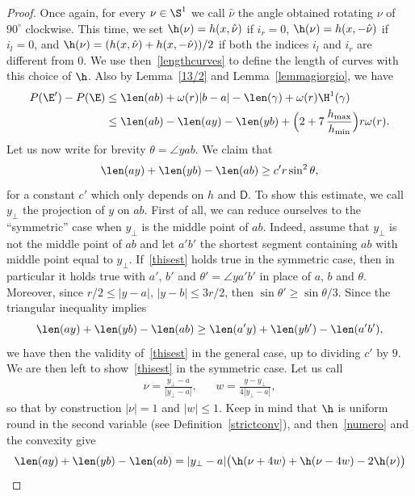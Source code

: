 \begin{proof}
Once again, for every $\nu\in\S^1$ we call $\hat\nu$ the angle obtained rotating $\nu$ of $90^\circ$ clockwise. This time, we set $\h(\nu)=h(x,\hat\nu)$ if $i_r=0$, $\h(\nu)=h(x,-\hat\nu)$ if $i_l=0$, and $\h(\nu)=(h(x,\hat\nu)+h(x,-\hat\nu))/2$ if both the indices $i_l$ and $i_r$ are different from $0$. We use then~\eqref{lengthcurves} to define the length of curves with this choice of $\h$. Also by Lemma~\ref{13/2} and Lemma~\ref{lemmagiorgio}, we have
\begin{equation}\label{rsi}\begin{split}
P(\E')-P(\E) &\leq \len(ab) +\omega(r) |b-a| - \len(\gamma) +\omega(r) \H^1(\gamma)\\
&\leq \len(ab) - \len(ay)-\len(yb) +\Bigl(2 +7\,\frac{h_{\max}}{h_{\min}}\Bigr) r \omega(r).
\end{split}\end{equation}
Let us now write for brevity $\theta=\angle yab$. We claim that
\begin{equation}\label{thisest}
\len(ay)+\len(yb)-\len(ab) \geq c' r \sin^2 \theta,
\end{equation}
for a constant $c'$ which only depends on $h$ and $\mathsf{D}$. To show this estimate, we call $y_\perp$ the projection of $y$ on $ab$. First of all, we can reduce ourselves to the ``symmetric'' case when $y_\perp$ is the middle point of $ab$. Indeed, assume that $y_\perp$ is not the middle point of $ab$ and let $a'b'$ the shortest segment containing $ab$ with middle point equal to $y_\perp$. If~\eqref{thisest} holds true in the symmetric case, then in particular it holds true with $a',\,b'$ and $\theta'=\angle y{a'}{b'}$ in place of $a,\,b$ and $\theta$. Moreover, since $r/2 \leq |y-a|,\, |y-b| \leq 3r/2$, then $\sin\theta' \geq \sin\theta/3$. Since the triangular inequality implies
\[
\len(ay)+\len(yb)-\len(ab) \geq
\len(a'y)+\len(yb')-\len(a'b'),
\]
we have then the validity of~\eqref{thisest} in the general case, up to dividing $c'$ by $9$. We are then left to show~\eqref{thisest} in the symmetric case. Let us call
\begin{align*}
\nu=\frac{y_\perp-a}{|y_\perp-a|} , && w=\frac{y-y_\perp}{4|y_\perp-a|},
\end{align*}
so that by construction $|\nu|=1$ and $|w|\leq 1$. Keep in mind that $\h$ is uniform round in the second variable (see Definition~\ref{strictconv}), and then~\eqref{numero} and the convexity give
\[\begin{split}
\len(ay)+\len(yb)-\len(ab)&=|y_\perp-a| \big(\h(\nu+4w)+\h(\nu-4w) -2\h(\nu)\big) \\

\end{split}\]
\end{proof}

